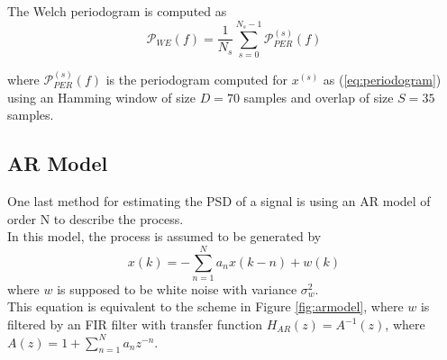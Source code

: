 \documentclass[a4paper, 12pt]{report}
\begin{document}
The Welch periodogram is computed as
\begin{equation}
\mathcal{P}_{WE}(f) = \frac{1}{N_s}\sum_{s=0}^{N_s-1}{\mathcal{P}}_{PER}^{(s)}(f)
\end{equation}

where ${\mathcal{P}}_{PER}^{(s)}(f)$ is the periodogram computed for $x^{(s)}$ as (\ref{eq:periodogram}) using an Hamming window of size $D=70$ samples and overlap of size $S=35$ samples.

\subsection*{AR Model}
One last method for estimating the PSD of a signal is using an AR model of order N to describe the process.\\
In this model, the process is assumed to be generated by
\begin{equation}
	x(k) = - \sum_{n=1}^N a_n x(k-n) + w(k)
\end{equation}
where $w$ is supposed to be white noise with variance $\sigma_w^2$.\\
This equation is equivalent to the scheme in Figure \ref{fig:armodel}, where $w$ is filtered by an FIR filter with transfer function $H_{AR}(z) = A^{-1}(z)$, where $A(z) = 1 + \sum_{n=1}^N a_n z^{-n}$.
\end{document}
